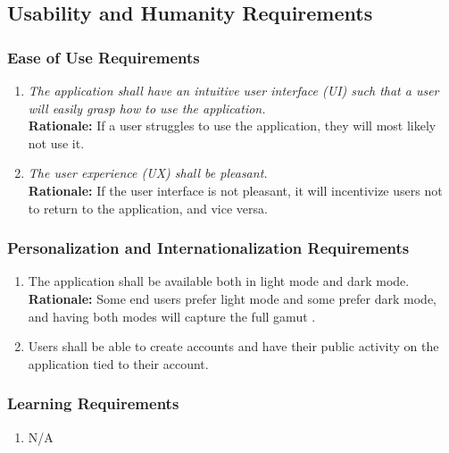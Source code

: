 \documentclass[]{article}
\begin{document}

\subsection{Usability and Humanity Requirements}
\label{sub:usability_and_humanity_requirements}

\subsubsection{Ease of Use Requirements}
\label{ssub:ease_of_use_requirements}
\begin{enumerate}[{UH-EOU}1. ]
    \item \textit{The application shall have an intuitive user interface (UI) such that a user will easily grasp how to use the application.} \\ \textbf{Rationale:} If a user struggles to use the application, they will most likely not use it.
    \item \textit{The user experience (UX) shall be pleasant.}  \\ \textbf{Rationale:} If the user interface is not pleasant, it will incentivize users not to return to the application, and vice versa.
\end{enumerate}

\subsubsection{Personalization and Internationalization Requirements}
\label{ssub:personalization_and_internationalization_requirements}
\begin{enumerate}[{UH-PI}1. ]
    \item The application shall be available both in light mode and dark mode. \\ \textbf{Rationale:} Some end users prefer light mode and some prefer dark mode, and having both modes will capture the full gamut \cite{NNgroup}. 
    \item Users shall be able to create accounts and have their public activity on the application tied to their account.
\end{enumerate}

\subsubsection{Learning Requirements}
\label{ssub:learning_requirements}
\begin{enumerate}[{UH-L}1. ]
	\item N/A
\end{enumerate}
\end{document}
